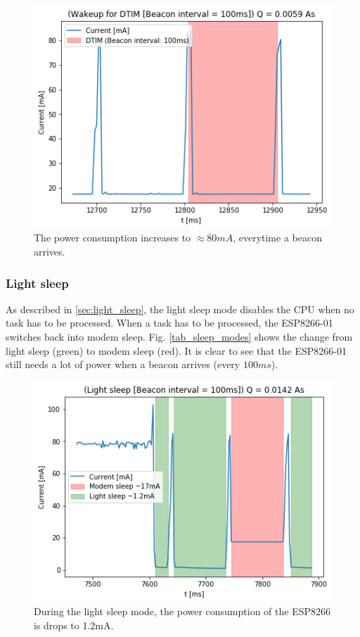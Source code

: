 \begin{figure}[h]
    \includegraphics[width = \linewidth]{fig/beacon_interval.png}
    \caption{The power consumption increases to $\approx 80mA$, everytime a beacon arrives.}
    \label{fig:beacon_interval}
\end{figure}

\subsubsection{Light sleep}
As described in \ref{sec:light_sleep}, the light sleep mode disables the CPU when no task has to be processed.
When a task has to be processed, the ESP8266-01 switches back into modem sleep.
Fig. \ref{tab_sleep_modes} shows the change from light sleep (green) to modem sleep (red).
It is clear to see that the ESP8266-01 still needs a lot of power when a beacon arrives (every $100ms$).

\begin{figure}[h]
    \includegraphics[width = \linewidth]{fig/light_sleep.png}
    \caption{During the light sleep mode, the power consumption of the ESP8266 is drops to 1.2mA.}
    \label{fig:light_sleep}
\end{figure}

